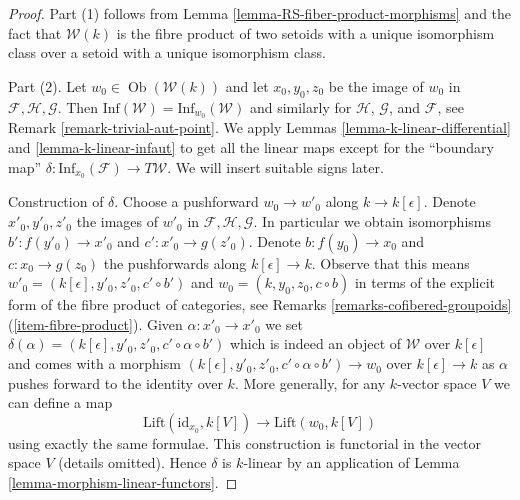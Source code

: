 \documentclass{stacks-project}
\theoremstyle{plain}
\theoremstyle{definition}
\theoremstyle{remark}
\numberwithin{equation}{subsection}
\def\Ob{\mathop{\mathrm{Ob}}\nolimits}
\begin{document}
\begin{proof}
Part (1) follows from Lemma \ref{lemma-RS-fiber-product-morphisms}
and the fact that $\mathcal{W}(k)$ is the fibre product of
two setoids with a unique isomorphism class over a setoid with
a unique isomorphism class.

\medskip\noindent
Part (2). Let $w_0 \in \Ob(\mathcal{W}(k))$ and let $x_0, y_0, z_0$ be
the image of $w_0$ in $\mathcal{F}, \mathcal{H}, \mathcal{G}$.
Then $\text{Inf}(\mathcal{W}) = \text{Inf}_{w_0}(\mathcal{W})$
and similarly for $\mathcal{H}$, $\mathcal{G}$, and $\mathcal{F}$, see
Remark \ref{remark-trivial-aut-point}.
We apply Lemmas \ref{lemma-k-linear-differential} and
\ref{lemma-k-linear-infaut} to get all the linear maps
except for the ``boundary map''
$\delta : \text{Inf}_{x_0}(\mathcal{F}) \to T\mathcal{W}$.
We will insert suitable signs later.

\medskip\noindent
Construction of $\delta$. Choose a pushforward $w_0 \to w'_0$ along
$k \to k[\epsilon]$. Denote $x'_0, y'_0, z'_0$ the images of $w'_0$ in
$\mathcal{F}, \mathcal{H}, \mathcal{G}$. In particular
we obtain isomorphisms $b' : f(y'_0) \to x'_0$ and $c' : x'_0 \to g(z'_0)$.
Denote $b : f(y_0) \to x_0$ and $c : x_0 \to g(z_0)$ the pushforwards
along $k[\epsilon] \to k$. Observe that this means
$w'_0 = (k[\epsilon], y'_0, z'_0, c' \circ b')$ and
$w_0 = (k, y_0, z_0, c \circ b)$ in terms of the explicit form
of the fibre product of categories,
see Remarks \ref{remarks-cofibered-groupoids} (\ref{item-fibre-product}).
Given $\alpha : x'_0 \to x'_0$ we set
$\delta(\alpha) = (k[\epsilon], y'_0, z'_0, c' \circ \alpha \circ b')$
which is indeed an object of $\mathcal{W}$ over $k[\epsilon]$ and comes
with a morphism $(k[\epsilon], y'_0, z'_0, c' \circ \alpha \circ b') \to w_0$
over $k[\epsilon] \to k$ as $\alpha$ pushes forward to the identity over $k$.
More generally, for any $k$-vector space $V$ we can define a map
$$
\text{Lift}(\text{id}_{x_0}, k[V])
\longrightarrow
\text{Lift}(w_0, k[V])
$$
using exactly the same formulae. This construction is functorial
in the vector space $V$ (details omitted). Hence $\delta$ is $k$-linear
by an application of
Lemma \ref{lemma-morphism-linear-functors}.


\end{proof}
\end{document}
